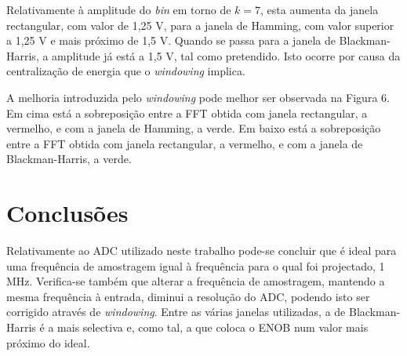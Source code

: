 \documentclass[11pt]{article}
\numberwithin{equation}{section}
\begin{document}
Relativamente à amplitude do \textit{bin} em torno de $k = 7$, esta aumenta da janela rectangular, com valor de 1,25 V, para a janela de Hamming, com valor superior a 1,25 V e mais próximo de 1,5 V. Quando se passa para a janela de Blackman-Harris, a amplitude já está a 1,5 V, tal como pretendido. Isto ocorre por causa da centralização de energia que o \textit{windowing} implica.

A melhoria introduzida pelo \textit{windowing} pode melhor ser observada na Figura 6. Em cima está a sobreposição entre a FFT obtida com janela rectangular, a vermelho, e com a janela de Hamming, a verde. Em baixo está a sobreposição entre a FFT obtida com janela rectangular, a vermelho, e com a janela de Blackman-Harris, a verde.

\section{Conclusões}

Relativamente ao ADC utilizado neste trabalho pode-se concluir que é ideal para uma frequência de amostragem igual à frequência para o qual foi projectado, 1 MHz. Verifica-se também que alterar a frequência de amostragem, mantendo a mesma frequência à entrada, diminui a resolução do ADC, podendo isto ser corrigido através de \textit{windowing}. Entre as várias janelas utilizadas, a de Blackman-Harris é a mais selectiva e, como tal, a que coloca o ENOB num valor mais próximo do ideal.
	 
\end{document}

